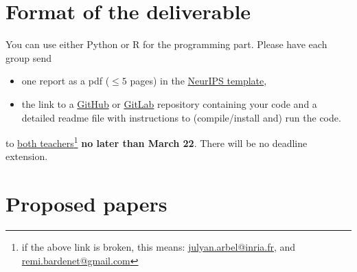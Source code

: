 \documentclass[12pt]{article}%
\begin{document}
\section{Format of the deliverable}
You can use either Python or R for the programming part. Please have each group send
\begin{itemize}
\item one report as a pdf ($\leq 5$ pages) in the \href{https://www.overleaf.com/latex/templates/neurips-2020/mnshsmqkjsqz}{NeurIPS template},
\item the link to a \href{https://github.com/}{GitHub} or  \href{https://about.gitlab.com/}{GitLab} repository containing your code and a detailed readme file with
  instructions to (compile/install and) run the code.
\end{itemize} to \href{mailto:julyan.arbel@inria.fr,remi.bardenet@gmail.com}{both teachers}\footnote{if the above link is broken, this means: \href{mailto:julyan.arbel@inria.fr}{julyan.arbel@inria.fr}, and \href{mailto:remi.bardenet@gmail.com}{remi.bardenet@gmail.com}} {\bf no later than March 22}. There will be no deadline extension.

\section{Proposed papers}
\label{s:papers}


\end{document}
